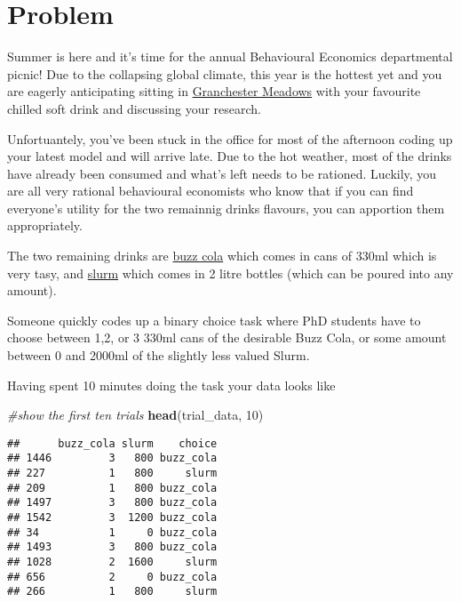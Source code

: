 \documentclass[]{article}
\newenvironment{Shaded}{\begin{snugshade}}{\end{snugshade}}
\newcommand{\KeywordTok}[1]{\textcolor[rgb]{0.13,0.29,0.53}{\textbf{#1}}}
\newcommand{\DecValTok}[1]{\textcolor[rgb]{0.00,0.00,0.81}{#1}}
\newcommand{\CommentTok}[1]{\textcolor[rgb]{0.56,0.35,0.01}{\textit{#1}}}
\newcommand{\NormalTok}[1]{#1}
\begin{document}
\section{Problem}\label{problem}

Summer is here and it's time for the annual Behavioural Economics
departmental picnic! Due to the collapsing global climate, this year is
the hottest yet and you are eagerly anticipating sitting in
\href{https://en.wikipedia.org/wiki/Grantchester_Meadows}{Granchester
Meadows} with your favourite chilled soft drink and discussing your
research.

Unfortuantely, you've been stuck in the office for most of the afternoon
coding up your latest model and will arrive late. Due to the hot
weather, most of the drinks have already been consumed and what's left
needs to be rationed. Luckily, you are all very rational behavioural
economists who know that if you can find everyone's utility for the two
remainnig drinks flavours, you can apportion them appropriately.

The two remaining drinks are
\href{https://media2.giphy.com/media/3oriffxcqE2syOd5Ty/giphy.gif}{buzz
cola} which comes in cans of 330ml which is very tasy, and
\href{https://comb.io/qbzoUv.gif}{slurm} which comes in 2 litre bottles
(which can be poured into any amount).

Someone quickly codes up a binary choice task where PhD students have to
choose between 1,2, or 3 330ml cans of the desirable Buzz Cola, or some
amount between 0 and 2000ml of the slightly less valued Slurm.

Having spent 10 minutes doing the task your data looks like

\begin{Shaded}
\begin{Highlighting}[]
\CommentTok{#show the first ten trials}
\KeywordTok{head}\NormalTok{(trial_data, }\DecValTok{10}\NormalTok{)}
\end{Highlighting}
\end{Shaded}

\begin{verbatim}
##      buzz_cola slurm    choice
## 1446         3   800 buzz_cola
## 227          1   800     slurm
## 209          1   800 buzz_cola
## 1497         3   800 buzz_cola
## 1542         3  1200 buzz_cola
## 34           1     0 buzz_cola
## 1493         3   800 buzz_cola
## 1028         2  1600     slurm
## 656          2     0 buzz_cola
## 266          1   800     slurm
\end{verbatim}
\end{document}
